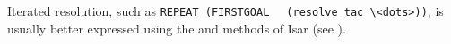 \begin{isabellebody}
\begin{isamarkuptext}
  \medskip Iterated resolution, such as \verb|REPEAT (FIRSTGOAL|\isasep\isanewline%
\verb|  (resolve_tac \<dots>))|, is usually better expressed using the \hyperlink{method.intro}{\mbox{}} and \hyperlink{method.elim}{\mbox{}} methods of Isar (see
  ).%
\end{isamarkuptext}%
\isamarkuptrue%
%
\isadelimtheory
%
\endisadelimtheory
%
\isatagtheory
{}\isamarkupfalse%
%
\endisatagtheory
{\isafoldtheory}%
%
\isadelimtheory
%
\endisadelimtheory
\isanewline
\end{isabellebody}%
